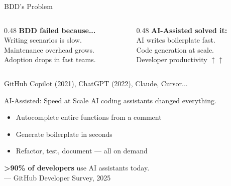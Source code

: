 \documentclass[aspectratio=169,18pt]{beamer}
\begin{document}
\begin{frame}{BDD's Problem}
  \vspace{0.3em}
  \begin{columns}[T]
    \begin{column}{0.48\textwidth}
      \textbf{\color{openred}BDD failed because...}\\[0.6em]
      \normalsize
      Writing scenarios is slow.\\[0.4em]
      Maintenance overhead grows.\\[0.4em]
      Adoption drops in fast teams.
    \end{column}
    \begin{column}{0.48\textwidth}
      \textbf{\color{opengreen}AI-Assisted solved it:}\\[0.6em]
      \normalsize
      AI writes boilerplate fast.\\[0.4em]
      Code generation at scale.\\[0.4em]
      Developer productivity $\uparrow\uparrow$
    \end{column}
  \end{columns}
  \vspace{1em}
  \small\color{opengray}GitHub Copilot (2021), ChatGPT (2022), Claude, Cursor...
\end{frame}

\begin{frame}{AI-Assisted: Speed at Scale}
  \vspace{0.3em}
  \large AI coding assistants changed everything.\\[1em]
  \normalsize
  \begin{itemize}\setlength\itemsep{0.5em}
    \item Autocomplete entire functions from a comment
    \item Generate boilerplate in seconds
    \item Refactor, test, document — all on demand
  \end{itemize}
  \vspace{0.8em}
  \textbf{>90\% of developers} use AI assistants today.\\
  \small\color{opengray}— GitHub Developer Survey, 2025
\end{frame}
\end{document}
